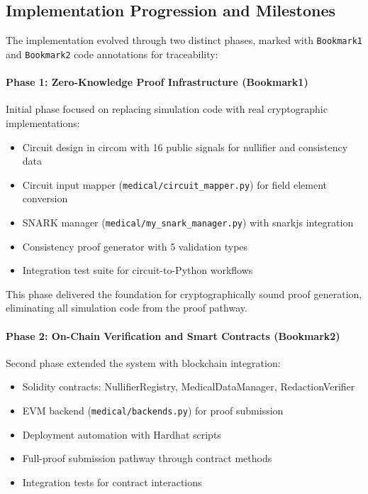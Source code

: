 \subsection{Implementation Progression and Milestones}

The implementation evolved through two distinct phases, marked with \texttt{Bookmark1} and \texttt{Bookmark2} code annotations for traceability:

\paragraph{Phase 1: Zero-Knowledge Proof Infrastructure (Bookmark1)}

Initial phase focused on replacing simulation code with real cryptographic implementations:

\begin{itemize}
    \item Circuit design in circom with 16 public signals for nullifier and consistency data
    \item Circuit input mapper (\texttt{medical/circuit\_mapper.py}) for field element conversion
    \item SNARK manager (\texttt{medical/my\_snark\_manager.py}) with snarkjs integration
    \item Consistency proof generator with 5 validation types
    \item Integration test suite for circuit-to-Python workflows
\end{itemize}

This phase delivered the foundation for cryptographically sound proof generation, eliminating all simulation code from the proof pathway.

\paragraph{Phase 2: On-Chain Verification and Smart Contracts (Bookmark2)}

Second phase extended the system with blockchain integration:

\begin{itemize}
    \item Solidity contracts: NullifierRegistry, MedicalDataManager, RedactionVerifier
    \item EVM backend (\texttt{medical/backends.py}) for proof submission
    \item Deployment automation with Hardhat scripts
    \item Full-proof submission pathway through contract methods
    \item Integration tests for contract interactions
\end{itemize}

